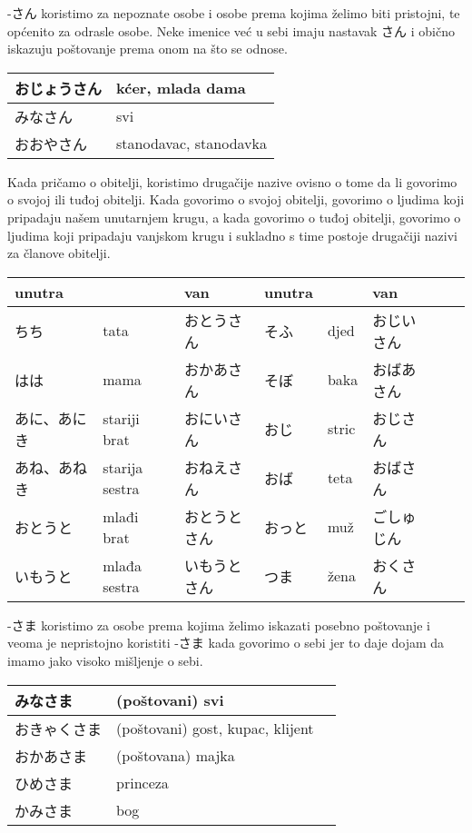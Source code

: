 	-さん	koristimo za nepoznate osobe i osobe prema kojima želimo biti pristojni, te općenito za odrasle osobe. Neke imenice već u sebi imaju nastavak さん i obično iskazuju poštovanje prema onom na što se odnose.
	
	
	\vspace{10pt}	
	
	\begin{tabular}{|l|l|}
		\hline
		おじょうさん&kćer, mlada dama\\\hline
		みなさん&svi\\\hline
		おおやさん&stanodavac, stanodavka\\\hline

	\end{tabular}
	
	\vspace{10pt}
	
	Kada pričamo o obitelji, koristimo drugačije nazive ovisno o tome da li govorimo o svojoj ili tuđoj obitelji. Kada govorimo o svojoj obitelji, govorimo o ljudima koji pripadaju našem unutarnjem krugu, a kada govorimo o tuđoj obitelji, govorimo o ljudima koji pripadaju vanjskom krugu i sukladno s time postoje drugačiji nazivi za članove obitelji.
	
	\vspace{10pt}	
	
	\begin{tabular}{|l|l|l||l|l|l|l|l|}
		\hline
		unutra& &van&unutra& &van\\\hline
		ちち&tata&おとうさん&そふ&djed&おじいさん\\\hline
		はは&mama&おかあさん&そぼ&baka&おばあさん\\\hline
		あに、あにき&stariji brat&おにいさん&おじ&stric&おじさん\\\hline
		あね、あねき&starija sestra&おねえさん&おば&teta&おばさん\\\hline
		おとうと&mlađi brat&おとうとさん&おっと&muž&ごしゅじん\\\hline
		いもうと&mlađa sestra&いもうとさん&つま&žena&おくさん\\\hline
	\end{tabular}
	
	-さま koristimo za osobe prema kojima želimo iskazati posebno poštovanje i veoma je nepristojno koristiti -さま kada govorimo o sebi jer to daje dojam da imamo jako visoko mišljenje o sebi.
	
	\vspace{10pt}
	
	\begin{tabular}{|l|l|l|}
		\hline
		みなさま&(poštovani) svi\\\hline
		おきゃくさま&(poštovani) gost, kupac, klijent\\\hline
		おかあさま&(poštovana) majka\\\hline
		ひめさま&princeza\\\hline
		かみさま&bog\\\hline
	\end{tabular}
	
